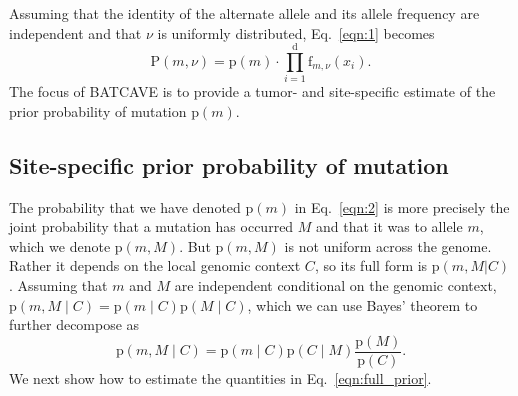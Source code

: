 \documentclass[a4,center,fleqn]{NAR}
\newcommand{\batcave}{BATCAVE }
\begin{document}
Assuming that the identity of the alternate allele and its allele frequency are independent and that $\nu$ is uniformly distributed, Eq.~\ref{eqn:1} becomes
\begin{equation}  \label{eqn:2}
  \mathrm{P}(m,\nu) = \mathrm{p}(m) \cdot \prod_{i=1}^{\mathrm{d}} \textrm{f}_{m,\nu}(x_i).
\end{equation}
The focus of \batcave is to provide a tumor- and site-specific estimate of the prior probability of mutation $\mathrm{p}(m)$.

\subsection{Site-specific prior probability of mutation}
The probability that we have denoted $\mathrm{p}(m)$ in Eq.~\ref{eqn:2} is more precisely the joint probability that a mutation has occurred $M$ and that it was to allele $m$, which we denote $\mathrm{p}(m,M)$.
But $\mathrm{p}(m,M)$ is not uniform across the genome.
Rather it depends on the local genomic context $C$, so its full form is $\mathrm{p}(m,M | C)$ \cite{Buisson2019}.
Assuming that $m$ and $M$ are independent conditional on the genomic context, $\mathrm{p}(m,M \mid C) = \mathrm{p}(m \mid C) \mathrm{p}(M \mid C)$, which we can use Bayes' theorem to further decompose as 
\begin{equation}
  \label{eqn:full_prior}
  \mathrm{p}(m,M \mid C) = \mathrm{p}(m \mid C) \mathrm{p}(C \mid M)\frac{\mathrm{p}(M)}{\mathrm{p}(C)}.
\end{equation}
We next show how to estimate the quantities in Eq.~\ref{eqn:full_prior}.
\end{document}
